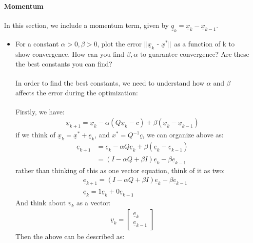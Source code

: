 \documentclass[11pt,letterpaper]{article}
\begin{document}
\newpage
\textbf{Momentum}
\\\\
In this section, we include a momentum term, given by $\underline q_k = \underline x_k - \underline x_{k-1}$.
\begin{tcolorbox}
    \begin{itemize}
        \item For a constant $\alpha > 0, \beta > 0$, plot the error $||\underline x_k \text{ - } \underline x^\ast ||$ as a function of k to show convergence. How can you find $\beta, \alpha$ to guarantee convergence? Are these the best constants you can find?
        \\\\
        In order to find the best constants, we need to understand how $\alpha$ and $\beta$ affects the error during the optimization:
        \\\\
        Firstly, we have:
        \begin{align*}
            \underline x_{k+1} = \underline x_k - \alpha(Q\underline x_k - c) + \beta(\underline x_k - \underline x_{k-1})
        \end{align*}
        if we think of $\underline x_k = \underline x^\ast + \underline e_k$, and $x^\ast = Q^{-1}\underline c$, we can organize above as:
        \begin{align*}
            \underline e_{k+1} &= \underline e_{k} - \alpha Q \underline e_k + \beta(\underline e_k - \underline e_{k-1}) \\
             &= (I - \alpha Q + \beta I)\underline e_k - \beta \underline e_{k-1}
        \end{align*}
        rather than thinking of this as one vector equation, think of it as two:
        \begin{align*}
             &\underline e_{k+1} = (I - \alpha Q + \beta I)\underline e_k - \beta \underline e_{k-1} \\
             &\underline e_k = 1 \underline e_k + 0 \underline e_{k-1}
        \end{align*}
        And think about $v_k$ as a vector:
        \begin{align*}
            \underline v_k = \begin{bmatrix}
                \underline e_k \\
                \underline e_{k-1}
            \end{bmatrix}
        \end{align*}
        Then the above can be described as:

\end{itemize}
\end{tcolorbox}
\end{document}
